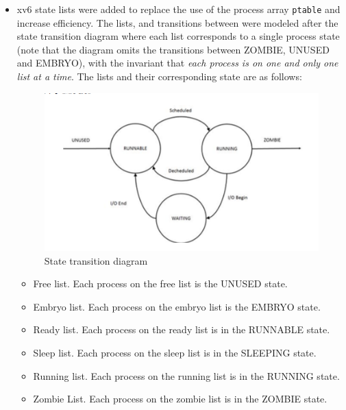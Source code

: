 \documentclass[11pt,letterpaper]{report}
\begin{document}
	\begin{itemize}
	
	\item xv6 state lists were added to replace the use of the process array {\tt ptable} and increase efficiency. The lists, and transitions between were modeled after the state transition diagram where each list corresponds to a single process state
	 	(note that the diagram omits the transitions between ZOMBIE, UNUSED and EMBRYO), with the invariant 
		that \emph{each process is on one and only one list at a time}. The lists and their corresponding state are as follows: 
	\begin{figure}[h!]
	\centering
	\includegraphics[width=0.3\linewidth]{state-transition.png}
	\caption{State transition diagram}
	\label{fig:0}
	\end{figure}

		\begin{itemize}
			\item Free list. Each process on the free list is the UNUSED state.
			\item Embryo list. Each process on the embryo list is the EMBRYO state.
			\item Ready list. Each process on the ready list is in the RUNNABLE state.
			\item Sleep list. Each process on the sleep list is in the SLEEPING state.
			\item Running list. Each process on the running list is in the RUNNING state.
			\item Zombie List. Each process on the zombie list is in the ZOMBIE state.
		\end{itemize}
		

\end{itemize}
\end{document}
